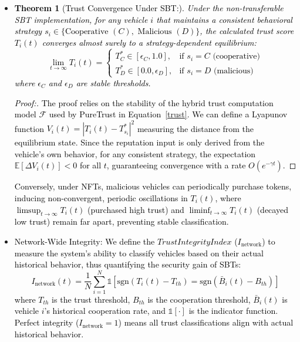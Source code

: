 \cite{cho2010survey}\documentclass[journal,comsoc,twoside]{IEEEtran}
\newtheorem{theorem}{Theorem}
\begin{document}
\begin{itemize}
    \item \textcolor{black}{
    \begin{theorem}[Trust Convergence Under SBT:]
    \label{sbt_convergence}
    Under the non-transferable SBT implementation, for any vehicle $i$ that maintains a consistent behavioral strategy $s_i \in \{\text{Cooperative } (C), \text{ Malicious } (D)\}$, the calculated trust score $T_i(t)$ converges almost surely to a strategy-dependent equilibrium:
    \begin{equation}
    \lim_{t \to \infty} T_i(t) = 
    \begin{cases}
    T^*_C \in [\epsilon_C, 1.0], & \text{if } s_i = C \text{ (cooperative)} \\
    T^*_D \in [0.0, \epsilon_D], & \text{if } s_i = D \text{ (malicious)}
    \end{cases}
    \end{equation}
    where $\epsilon_C$ and $\epsilon_D$ are stable thresholds.
    \end{theorem} }
    
    \textcolor{black}{
    \begin{proof}[Proof:]
    The proof relies on the stability of the hybrid trust computation model $\mathcal{F}$ used by PureTrust in Equation~\ref{trust}. We can define a Lyapunov function $V_i(t) = |T_i(t) - T^*_{s_i}|^2$ measuring the distance from the equilibrium state. Since the reputation input is only derived from the vehicle's own behavior, for any consistent strategy, the expectation $\mathbb{E}[\Delta V_i(t)] < 0$ for all $t$, guaranteeing convergence with a rate $O(e^{-\gamma t})$.
    \end{proof}}

    \textcolor{black}{
    Conversely, under NFTs, malicious vehicles can periodically purchase tokens, inducing non-convergent, periodic oscillations in $T_i(t)$, where $\limsup_{t \to \infty} T_i(t)$ (purchased high trust) and $\liminf_{t \to \infty} T_i(t)$ (decayed low trust) remain far apart, preventing stable classification.}
    
    \item \textcolor{black}{Network-Wide Integrity:
    We define the $Trust Integrity Index$ ($I_{\text{network}}$) to measure the system's ability to classify vehicles based on their actual historical behavior, thus quantifying the security gain of SBTs:
    \begin{equation}
    I_{\text{network}}(t) = \frac{1}{N} \sum_{i=1}^{N} \mathbb{1}\left[
    \text{sgn}(T_i(t) - T_{th}) = \text{sgn}(\bar{B}_i(t) - B_{th})\right]
    \label{integrity_index}
    \end{equation}
    where $T_{th}$ is the trust threshold, $B_{th}$ is the cooperation threshold, $\bar{B}_i(t)$ is vehicle $i$'s historical cooperation rate, and $\mathbb{1}[\cdot]$ is the indicator function. Perfect integrity ($I_{\text{network}} = 1$) means all trust classifications align with actual historical behavior.}
    

\end{itemize}
\end{document}
